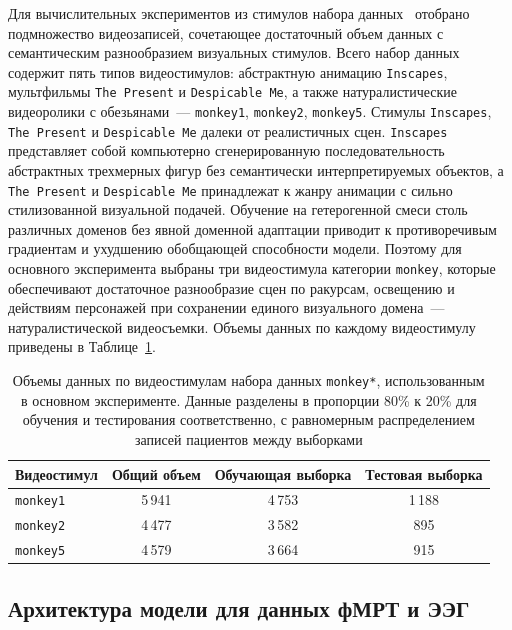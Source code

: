 Для вычислительных экспериментов из стимулов набора данных~\cite{Telesford2023} отобрано подмножество видеозаписей, сочетающее достаточный объем данных с семантическим разнообразием визуальных стимулов. Всего набор данных содержит пять типов видеостимулов: абстрактную анимацию \texttt{Inscapes}, мультфильмы \texttt{The Present} и \texttt{Despicable Me}, а также натуралистические видеоролики с обезьянами~--- \texttt{monkey1}, \texttt{monkey2}, \texttt{monkey5}. Стимулы \texttt{Inscapes}, \texttt{The Present} и \texttt{Despicable Me} далеки от реалистичных сцен. \texttt{Inscapes} представляет собой компьютерно сгенерированную последовательность абстрактных трехмерных фигур без семантически интерпретируемых объектов, а \texttt{The Present} и \texttt{Despicable Me} принадлежат к жанру анимации с сильно стилизованной визуальной подачей. Обучение на гетерогенной смеси столь различных доменов без явной доменной адаптации приводит к противоречивым градиентам и ухудшению обобщающей способности модели. Поэтому для основного эксперимента выбраны три видеостимула категории \texttt{monkey}, которые обеспечивают достаточное разнообразие сцен по ракурсам, освещению и действиям персонажей при сохранении единого визуального домена~--- натуралистической видеосъемки. Объемы данных по каждому видеостимулу приведены в Таблице~\ref{tab:monkey_dataset}.

\begin{table}[h!]
    \centering
    \caption{Объемы данных по видеостимулам набора данных \texttt{monkey*}, использованным в основном эксперименте. Данные разделены в пропорции 80\% к 20\% для обучения и тестирования соответственно, с равномерным распределением записей пациентов между выборками}
    \label{tab:monkey_dataset}
    \begin{tabular}{lccc}
        \toprule
        Видеостимул & Общий объем & Обучающая выборка & Тестовая выборка \\
        \midrule
        \texttt{monkey1} & 5\,941 &  4\,753 & 1\,188 \\
        \texttt{monkey2} & 4\,477 & 3\,582 & 895 \\
        \texttt{monkey5} & 4\,579 & 3\,664 & 915 \\
        \bottomrule
    \end{tabular}
\end{table}

\subsection{Архитектура модели для данных фМРТ и ЭЭГ}\label{sec4:hyper}

